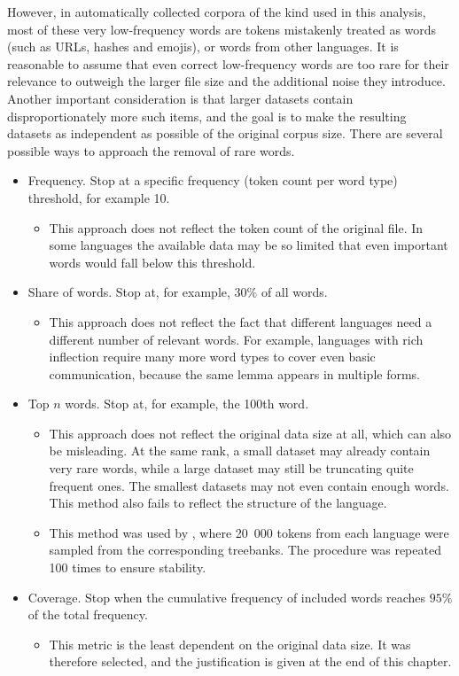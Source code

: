 However, in automatically collected corpora of the kind used in this analysis, most of these very low-frequency words are tokens mistakenly treated as words (such as URLs, hashes and emojis), or words from other languages. It is reasonable to assume that even correct low-frequency words are too rare for their relevance to outweigh the larger file size and the additional noise they introduce. Another important consideration is that larger datasets contain disproportionately more such items, and the goal is to make the resulting datasets as independent as possible of the original corpus size. There are several possible ways to approach the removal of rare words.
\begin{itemize}
    \item Frequency. Stop at a specific frequency (token count per word type) threshold, for example 10.
    \begin{itemize}
        \item This approach does not reflect the token count of the original file. In some languages the available data may be so limited that even important words would fall below this threshold.
    \end{itemize}
    \item Share of words. Stop at, for example, $30\%$ of all words.
    \begin{itemize}
        \item This approach does not reflect the fact that different languages need a different number of relevant words. For example, languages with rich inflection require many more word types to cover even basic communication, because the same lemma appears in multiple forms.
    \end{itemize}
    \item Top $n$ words. Stop at, for example, the 100th word.
    \begin{itemize}
        \item This approach does not reflect the original data size at all, which can also be misleading. At the same rank, a small dataset may already contain very rare words, while a large dataset may still be truncating quite frequent ones. The smallest datasets may not even contain enough words. This method also fails to reflect the structure of the language.
        \item This method was used by \textcite{Coltekin2022}, where 20~000 tokens from each language were sampled from the corresponding treebanks. The procedure was repeated 100 times to ensure stability.
    \end{itemize}
    \item Coverage. Stop when the cumulative frequency of included words reaches $95\%$ of the total frequency.
    \begin{itemize}
        \item This metric is the least dependent on the original data size. It was therefore selected, and the justification is given at the end of this chapter.
    \end{itemize}
\end{itemize}

